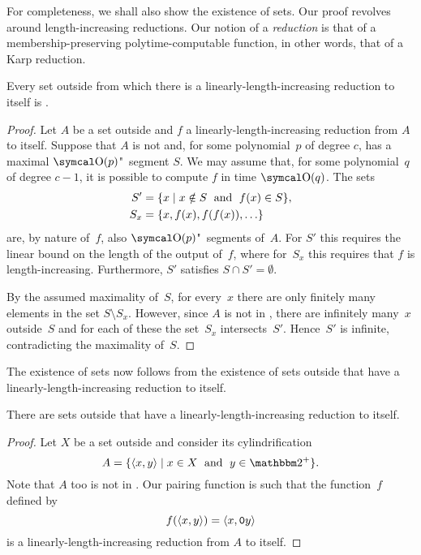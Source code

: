 For completeness, we shall also show the existence of  sets.
Our proof revolves around length-increasing reductions.
Our notion of a \emph{reduction} is that of a membership-preserving polytime-computable function, in other words, that of a Karp reduction.
\begin{theorem}
  Every set outside  from which there is a linearly-length-increasing reduction to itself is .
\end{theorem}
\begin{proof}
  Let $A$ be a set outside  and $f$ a linearly-length-increasing reduction from $A$ to itself.
  Suppose that $A$ is not  and, for some polynomial~$p$ of degree $c$, has a maximal $\bigO(p)$"~segment $S$.
  We may assume that, for some polynomial~$q$ of degree $c - 1$, it is possible to compute $f$ in time $\bigO(q)$.
  The sets
  \begin{align*}
    S' &= \{x \;|\; x \notin S \;\text{ and }\; f(x) \in S\}, \\
    S_x &= \{x, f(x), f(f(x)), \ldots\}
  \end{align*}
  are, by nature of~$f$, also $\bigO(p)$"~segments of~$A$.
  For $S'$ this requires the linear bound on the length of the output of~$f$, where for~$S_x$ this requires that $f$ is length-increasing.
  Furthermore, $S'$ satisfies $S \cap S' = \emptyset$.

  By the assumed maximality of~$S$, for every~$x$ there are only finitely many elements in the set $S \setminus S_x$.
  However, since $A$ is not in , there are infinitely many~$x$ outside~$S$ and for each of these the set~$S_x$ intersects~$S'$.
  Hence~$S'$ is infinite, contradicting the maximality of~$S$.
\end{proof}

The existence of  sets now follows from the existence of sets outside  that have a linearly-length-increasing reduction to itself.
\begin{lemma}
  There are sets outside  that have a linearly-length-increasing reduction to itself.
\end{lemma}
\begin{proof}
  Let $X$ be a set outside  and consider its cylindrification \parencite{balcazar1990structural}
  \begin{equation*}
    A \deq \{\pair{x}{y} \st x \in X \reland y \in \binary^+\}.
  \end{equation*}
  Note that $A$ too is not in .
  Our pairing function is such that the function~$f$ defined by
  \begin{equation*}
    f({\langle x, y\rangle}) = {\langle x, \textnormal{\texttt{0}}y\rangle}
  \end{equation*}
  is a linearly-length-increasing reduction from $A$ to itself.
\end{proof}

